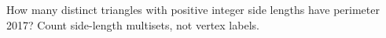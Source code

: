 How many distinct triangles with positive integer side lengths have perimeter 2017? Count side-length multisets, not vertex labels.
